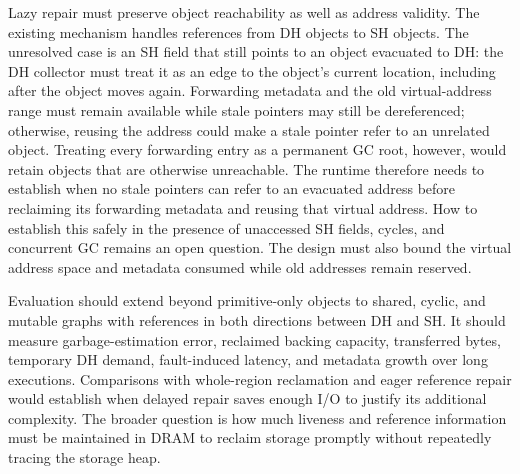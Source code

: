 Lazy repair must preserve object reachability as well as address validity.
The existing mechanism handles references from DH objects to SH objects.
The unresolved case is an SH field that still points to an object evacuated to DH: the DH collector must treat it as an edge to the object's current location, including after the object moves again.
Forwarding metadata and the old virtual-address range must remain available while stale pointers may still be dereferenced; otherwise, reusing the address could make a stale pointer refer to an unrelated object.
Treating every forwarding entry as a permanent GC root, however, would retain objects that are otherwise unreachable.
The runtime therefore needs to establish when no stale pointers can refer to an evacuated address before reclaiming its forwarding metadata and reusing that virtual address.
How to establish this safely in the presence of unaccessed SH fields, cycles, and concurrent GC remains an open question.
The design must also bound the virtual address space and metadata consumed while old addresses remain reserved.

Evaluation should extend beyond primitive-only objects to shared, cyclic, and mutable graphs with references in both directions between DH and SH.
It should measure garbage-estimation error, reclaimed backing capacity, transferred bytes, temporary DH demand, fault-induced latency, and metadata growth over long executions.
Comparisons with whole-region reclamation and eager reference repair would establish when delayed repair saves enough I/O to justify its additional complexity.
The broader question is how much liveness and reference information must be maintained in DRAM to reclaim storage promptly without repeatedly tracing the storage heap.
